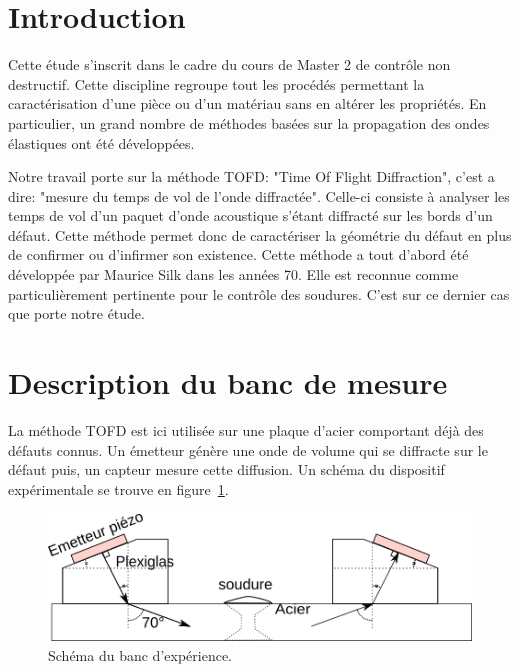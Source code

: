 \documentclass[twoside]{article}
\begin{document}
\begin{multicols}{2} %

\section{Introduction}
Cette étude s'inscrit dans le cadre du cours de Master 2 de contrôle non destructif. Cette discipline regroupe tout les procédés permettant la caractérisation d'une pièce ou d'un matériau sans en altérer les propriétés. En particulier, un grand nombre de méthodes basées sur la propagation des ondes élastiques ont été développées.

Notre travail porte sur la méthode TOFD: "Time Of Flight Diffraction", c'est a dire: "mesure du temps de vol de l'onde diffractée". Celle-ci consiste à analyser les temps de vol d'un paquet d'onde acoustique s'étant diffracté sur les bords d'un défaut. Cette méthode permet donc de caractériser la géométrie du défaut en plus de confirmer ou d'infirmer son existence. Cette méthode a tout d'abord été développée par Maurice Silk  \cite{artfonda1} dans les années 70. Elle est reconnue comme particulièrement pertinente pour le contrôle des soudures. C'est sur ce dernier cas que porte notre étude.


\section{Description du banc de mesure}
La méthode TOFD est ici utilisée sur une plaque d'acier comportant déjà des défauts connus. Un émetteur génère une onde de volume qui se diffracte sur le défaut puis, un capteur mesure cette diffusion. Un schéma du dispositif expérimentale se trouve en figure~\ref{schema1}.
\bigskip

\begin{figure}[H]
\centering
\includegraphics[scale=0.7]{./images/schema_expe.png}
\caption{\label{schema1} Schéma du banc d'expérience. }
\end{figure}


\end{multicols}
\end{document}
